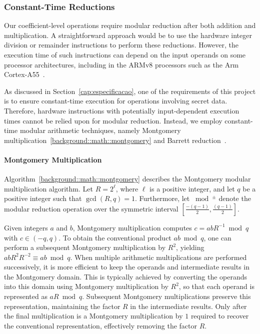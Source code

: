 \subsubsection{Constant-Time Reductions}
\label{ckks:cte_red}

Our coefficient-level operations require modular reduction after both addition and multiplication. A straightforward approach would be to use the hardware integer division or remainder instructions to perform these reductions. However, the execution time of such instructions can depend on the input operands on some processor architectures, including in the ARMv8 processors such as the Arm Cortex-A55~\cite{arm2023cortexa55}.

As discussed in Section~\ref{cap:especificacao}, one of the requirements of this project is to ensure constant-time execution for operations involving secret data. Therefore, hardware instructions with potentially input-dependent execution times cannot be relied upon for modular reduction. Instead, we employ constant-time modular arithmetic techniques, namely Montgomery multiplication~\ref{background::math::montgomery} and Barrett reduction~\cite{barrett1986implementing}.

\paragraph{Montgomery Multiplication}

Algorithm~\ref{background::math::montgomery} describes the Montgomery modular multiplication algorithm. Let $R = 2^\ell$, where $\ell$ is a positive integer, and let $q$ be a positive integer such that $\gcd(R,q)=1$. Furthermore, let $\bmod^{\pm}$ denote the modular reduction operation over the symmetric interval $\left[\frac{-(q-1)}{2}, \frac{(q-1)}{2}\right]$.

Given integers $a$ and $b$, Montgomery multiplication computes $c = abR^{-1} \bmod q$ with $c \in (-q, q)$. To obtain the conventional product $ab \bmod q$, one can perform a subsequent Montgomery multiplication by $R^2$, yielding $abR^2R^{-2} \equiv ab \bmod q$. When multiple arithmetic multiplications are performed successively, it is more efficient to keep the operands and intermediate results in the Montgomery domain. This is typically achieved by converting the operands into this domain using Montgomery multiplication by $R^2$, so that each operand is represented as $aR \bmod q$. Subsequent Montgomery multiplications preserve this representation, maintaining the factor $R$ in the intermediate results. Only after the final multiplication is a Montgomery multiplication by $1$ required to recover the conventional representation, effectively removing the factor $R$.

